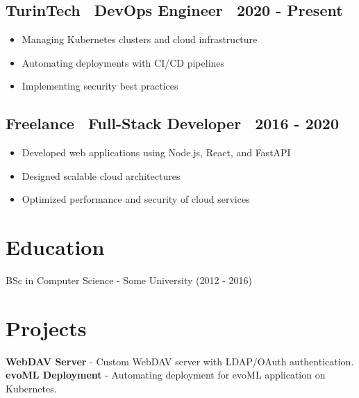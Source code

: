 \documentclass[a4paper,10pt]{article}
\begin{document}
\subsection*{TurinTech \textbar\ DevOps Engineer \textbar\ 2020 - Present}
\begin{itemize}[left=0pt, label=]
    \item Managing Kubernetes clusters and cloud infrastructure
    \item Automating deployments with CI/CD pipelines
    \item Implementing security best practices
\end{itemize}

\subsection*{Freelance \textbar\ Full-Stack Developer \textbar\ 2016 - 2020}
\begin{itemize}[left=0pt, label=]
    \item Developed web applications using Node.js, React, and FastAPI
    \item Designed scalable cloud architectures
    \item Optimized performance and security of cloud services
\end{itemize}

\vspace{2pt}

\section*{ Education}
BSc in Computer Science - Some University (2012 - 2016)

\vspace{2pt}

\section*{ Projects}
\textbf{ WebDAV Server} - Custom WebDAV server with LDAP/OAuth authentication.\\
\textbf{ evoML Deployment} - Automating deployment for evoML application on Kubernetes.
\end{document}
